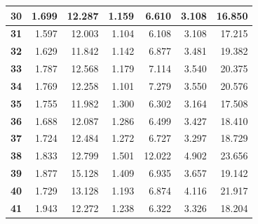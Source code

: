 \documentclass[12pt]{article}
\begin{document}
\begin{table}[!htbp]
{\begin{tabular}{crrrrr|r|}
\multicolumn{1}{|c|}{\textbf{30}} & \multicolumn{1}{r|}{1.699} & \multicolumn{1}{r|}{12.287} & \multicolumn{1}{r|}{1.159} & \multicolumn{1}{r|}{6.610} & 3.108 & 16.850 \\ \hline
\multicolumn{1}{|c|}{\textbf{31}} & \multicolumn{1}{r|}{1.597} & \multicolumn{1}{r|}{12.003} & \multicolumn{1}{r|}{1.104} & \multicolumn{1}{r|}{6.108} & 3.108 & 17.215 \\ \hline
\multicolumn{1}{|c|}{\textbf{32}} & \multicolumn{1}{r|}{1.629} & \multicolumn{1}{r|}{11.842} & \multicolumn{1}{r|}{1.142} & \multicolumn{1}{r|}{6.877} & 3.481 & 19.382 \\ \hline
\multicolumn{1}{|c|}{\textbf{33}} & \multicolumn{1}{r|}{1.787} & \multicolumn{1}{r|}{12.568} & \multicolumn{1}{r|}{1.179} & \multicolumn{1}{r|}{7.114} & 3.540 & 20.375 \\ \hline
\multicolumn{1}{|c|}{\textbf{34}} & \multicolumn{1}{r|}{1.769} & \multicolumn{1}{r|}{12.258} & \multicolumn{1}{r|}{1.101} & \multicolumn{1}{r|}{7.279} & 3.550 & 20.576 \\ \hline
\multicolumn{1}{|c|}{\textbf{35}} & \multicolumn{1}{r|}{1.755} & \multicolumn{1}{r|}{11.982} & \multicolumn{1}{r|}{1.300} & \multicolumn{1}{r|}{6.302} & 3.164 & 17.508 \\ \hline
\multicolumn{1}{|c|}{\textbf{36}} & \multicolumn{1}{r|}{1.688} & \multicolumn{1}{r|}{12.087} & \multicolumn{1}{r|}{1.286} & \multicolumn{1}{r|}{6.499} & 3.427 & 18.410 \\ \hline
\multicolumn{1}{|c|}{\textbf{37}} & \multicolumn{1}{r|}{1.724} & \multicolumn{1}{r|}{12.484} & \multicolumn{1}{r|}{1.272} & \multicolumn{1}{r|}{6.727} & 3.297 & 18.729 \\ \hline
\multicolumn{1}{|c|}{\textbf{38}} & \multicolumn{1}{r|}{1.833} & \multicolumn{1}{r|}{12.799} & \multicolumn{1}{r|}{1.501} & \multicolumn{1}{r|}{12.022} & 4.902 & 23.656 \\ \hline
\multicolumn{1}{|c|}{\textbf{39}} & \multicolumn{1}{r|}{1.877} & \multicolumn{1}{r|}{15.128} & \multicolumn{1}{r|}{1.409} & \multicolumn{1}{r|}{6.935} & 3.657 & 19.142 \\ \hline
\multicolumn{1}{|c|}{\textbf{40}} & \multicolumn{1}{r|}{1.729} & \multicolumn{1}{r|}{13.128} & \multicolumn{1}{r|}{1.193} & \multicolumn{1}{r|}{6.874} & 4.116 & 21.917 \\ \hline
\multicolumn{1}{|c|}{\textbf{41}} & \multicolumn{1}{r|}{1.943} & \multicolumn{1}{r|}{12.272} & \multicolumn{1}{r|}{1.238} & \multicolumn{1}{r|}{6.322} & 3.326 & 18.204 \\ \hline

\end{tabular}}
\end{table}
\end{document}
